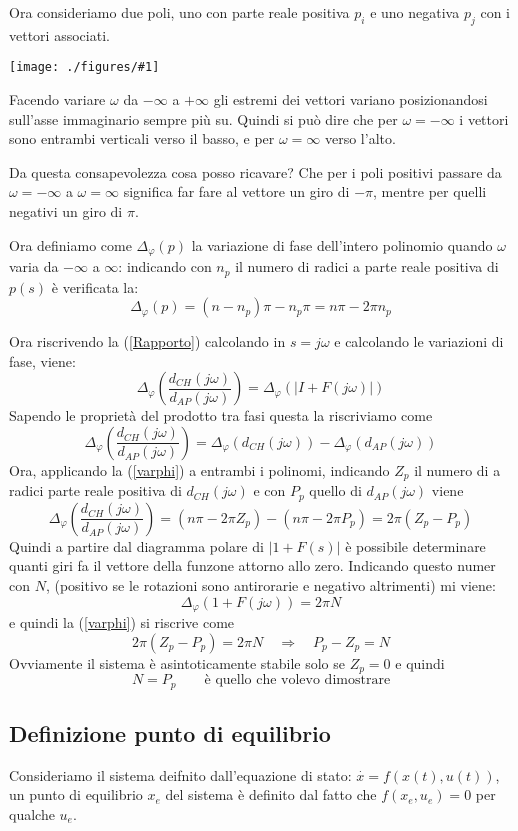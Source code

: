\documentclass{article}
\newcommand{\incfig}[2]{%
	\texttt{[image: ./figures/\#1]}%
}
\begin{document}
Ora consideriamo due poli, uno con parte reale positiva $p_i$ e uno negativa $p_j$  con i vettori associati.

\incfig{pipj.jpeg}{0.5}

Facendo variare $\omega$ da $-\infty$ a $+\infty$ gli estremi dei vettori variano posizionandosi
sull'asse immaginario sempre più su. Quindi si può dire che per $\omega=-\infty$ i vettori sono entrambi verticali verso il basso,
e per $\omega=\infty$ verso l'alto.

Da questa consapevolezza cosa posso ricavare? Che per i poli positivi passare da $\omega=-\infty$ a $\omega=\infty$
significa far fare al vettore un giro di $-\pi$, mentre per quelli negativi un giro di $\pi$.

Ora definiamo come $\Delta_{\varphi}(p)$ la variazione di fase dell'intero polinomio
quando $\omega$ varia da $-\infty$ a $\infty$: indicando con $n_p$ il numero di radici a parte reale positiva di $p(s)$
è verificata la:
\begin{equation}\label{varphi}
    \Delta_{\varphi}(p) = (n-n_p)\pi-n_p\pi=n\pi-2\pi n_p
\end{equation}

Ora riscrivendo la (\ref{Rapporto}) calcolando in $s = j\omega$ e calcolando le variazioni di fase,
viene:
\[
\Delta_{\varphi}\left(\frac{d_{CH}(j\omega)}{d_{AP}(j\omega)} \right)= \Delta_{\varphi}\left(|I+F(j\omega)|\right)
\]
Sapendo le proprietà del prodotto tra fasi questa la riscriviamo come
\[
    \Delta_{\varphi}\left(\frac{d_{CH}(j\omega)}{d_{AP}(j\omega)} \right)=
    \Delta_{\varphi}(d_{CH}(j\omega))-\Delta_{\varphi}(d_{AP}(j\omega))
\]
Ora, applicando la (\ref{varphi}) a entrambi i polinomi, indicando $Z_p$ il numero di a radici parte reale positiva
di $d_{CH}(j\omega)$ e con $P_p$ quello di $d_{AP}(j\omega)$ viene
\[
    \Delta_{\varphi}\left(\frac{d_{CH}(j\omega)}{d_{AP}(j\omega)} \right)=
    (n\pi-2\pi Z_p)-(n\pi-2\pi P_p)=2\pi(Z_p-P_p)
\]
Quindi a partire dal diagramma polare di $|1+F(s)|$ è possibile determinare quanti giri 
fa il vettore della funzone attorno allo zero. Indicando questo numer con $N$,
(positivo se le rotazioni sono antirorarie e negativo altrimenti) mi viene:
\[
\Delta_{\varphi}(1+F(j\omega))=2\pi N    
\]
e quindi la (\ref{varphi}) si riscrive come 
\[
    2\pi(Z_p-P_p)=2\pi N \quad \Longrightarrow \quad P_p-Z_p = N
\]
Ovviamente il sistema è asintoticamente stabile solo se $Z_p=0$ e quindi 
\[N= P_p\quad\quad \text{è quello che volevo dimostrare}\]


\subsection{Definizione punto di equilibrio}
Consideriamo il sistema deifnito dall'equazione di stato: $ \overset{\cdot}{x} = f(x(t),u(t)) $, un punto di 
equilibrio $x_e$ del sistema è definito dal fatto che $f(x_e,u_e) = 0$ per qualche $u_e$.
\end{document}
